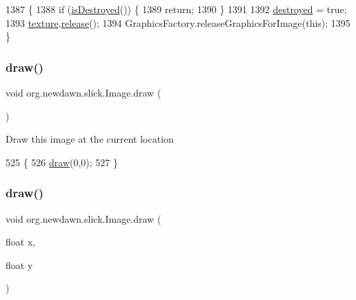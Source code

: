 \begin{DoxyCode}
1387                                                 \{
1388         \textcolor{keywordflow}{if} (\mbox{\hyperlink{classorg_1_1newdawn_1_1slick_1_1_image_aad142bf2d948c1c32750b42f10dc5388}{isDestroyed}}()) \{
1389             \textcolor{keywordflow}{return};
1390         \}
1391         
1392         \mbox{\hyperlink{classorg_1_1newdawn_1_1slick_1_1_image_a1e070cb684b88b8c22db4063b8118dcd}{destroyed}} = \textcolor{keyword}{true};
1393         \mbox{\hyperlink{classorg_1_1newdawn_1_1slick_1_1_image_a9fd9ddb21247305c83ac4e37d9d51f79}{texture}}.\mbox{\hyperlink{interfaceorg_1_1newdawn_1_1slick_1_1opengl_1_1_texture_a57d72d7a615be1b481410739479989a6}{release}}();
1394         GraphicsFactory.releaseGraphicsForImage(\textcolor{keyword}{this});
1395     \}
\end{DoxyCode}
\mbox{\label{classorg_1_1newdawn_1_1slick_1_1_image_a9bddcca05c7140ab45df8ac5b250b6cd}} 
\subsubsection{\texorpdfstring{draw()}{draw()}\hspace{0.1cm}{\footnotesize\ttfamily [1/10]}}
{\footnotesize\ttfamily void org.\+newdawn.\+slick.\+Image.\+draw (\begin{DoxyParamCaption}{ }\end{DoxyParamCaption})\hspace{0.3cm}{\ttfamily [inline]}}

Draw this image at the current location 
\begin{DoxyCode}
525                        \{
526         \mbox{\hyperlink{classorg_1_1newdawn_1_1slick_1_1_image_a9bddcca05c7140ab45df8ac5b250b6cd}{draw}}(0,0);
527     \}
\end{DoxyCode}
\mbox{\label{classorg_1_1newdawn_1_1slick_1_1_image_a47a2d7ef96a03050ac9718d2c22129e6}} 
\subsubsection{\texorpdfstring{draw()}{draw()}\hspace{0.1cm}{\footnotesize\ttfamily [2/10]}}
{\footnotesize\ttfamily void org.\+newdawn.\+slick.\+Image.\+draw (\begin{DoxyParamCaption}\item[{float}]{x,  }\item[{float}]{y }\end{DoxyParamCaption})\hspace{0.3cm}{\ttfamily [inline]}}

